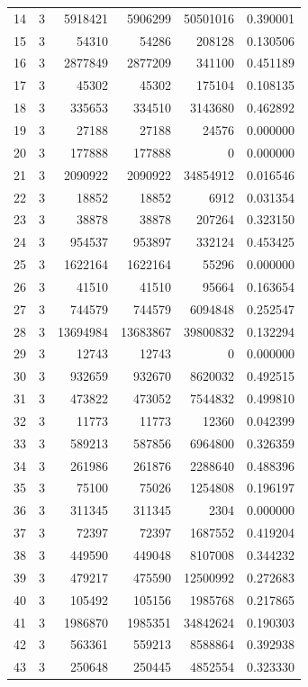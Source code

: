 \begin{longtable}{rrrrrr}
14 & 3 & 5918421 & 5906299 & 50501016 & 0.390001\\
15 & 3 & 54310 & 54286 & 208128 & 0.130506\\
16 & 3 & 2877849 & 2877209 & 341100 & 0.451189\\
17 & 3 & 45302 & 45302 & 175104 & 0.108135\\
18 & 3 & 335653 & 334510 & 3143680 & 0.462892\\
19 & 3 & 27188 & 27188 & 24576 & 0.000000\\
20 & 3 & 177888 & 177888 & 0 & 0.000000\\
21 & 3 & 2090922 & 2090922 & 34854912 & 0.016546\\
22 & 3 & 18852 & 18852 & 6912 & 0.031354\\
23 & 3 & 38878 & 38878 & 207264 & 0.323150\\
24 & 3 & 954537 & 953897 & 332124 & 0.453425\\
25 & 3 & 1622164 & 1622164 & 55296 & 0.000000\\
26 & 3 & 41510 & 41510 & 95664 & 0.163654\\
27 & 3 & 744579 & 744579 & 6094848 & 0.252547\\
28 & 3 & 13694984 & 13683867 & 39800832 & 0.132294\\
29 & 3 & 12743 & 12743 & 0 & 0.000000\\
30 & 3 & 932659 & 932670 & 8620032 & 0.492515\\
31 & 3 & 473822 & 473052 & 7544832 & 0.499810\\
32 & 3 & 11773 & 11773 & 12360 & 0.042399\\
33 & 3 & 589213 & 587856 & 6964800 & 0.326359\\
34 & 3 & 261986 & 261876 & 2288640 & 0.488396\\
35 & 3 & 75100 & 75026 & 1254808 & 0.196197\\
36 & 3 & 311345 & 311345 & 2304 & 0.000000\\
37 & 3 & 72397 & 72397 & 1687552 & 0.419204\\
38 & 3 & 449590 & 449048 & 8107008 & 0.344232\\
39 & 3 & 479217 & 475590 & 12500992 & 0.272683\\
40 & 3 & 105492 & 105156 & 1985768 & 0.217865\\
41 & 3 & 1986870 & 1985351 & 34842624 & 0.190303\\
42 & 3 & 563361 & 559213 & 8588864 & 0.392938\\
43 & 3 & 250648 & 250445 & 4852554 & 0.323330\\

\end{longtable}
